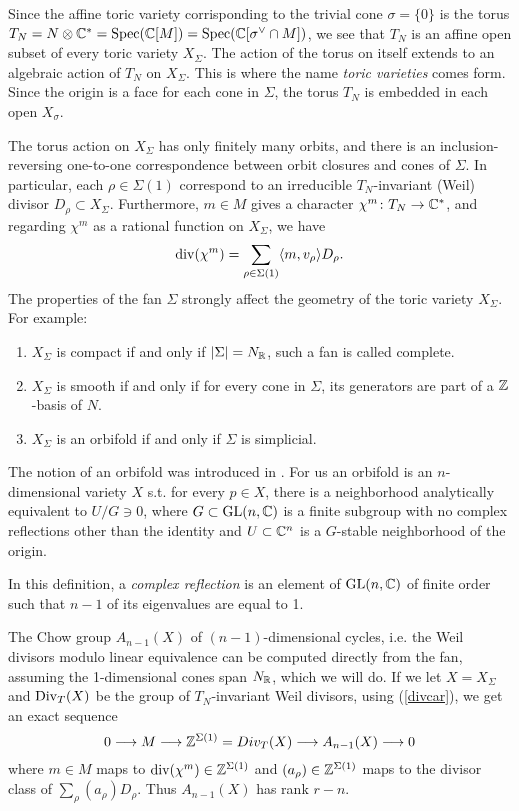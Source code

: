 \documentclass[../main.tex]{subfiles}
\begin{document}
%
%

Since the affine toric variety corrisponding to the trivial cone $\sigma=\{0\}$ is the torus $T_N = N \otimes \mathbb{C}^* = \operatorname{Spec}(\mathbb{C}[M]) = \operatorname{Spec}(\mathbb{C}[\sigma^\vee \cap M])$, we see that $T_N$ is an affine open subset of every toric variety $X_\Sigma$. The action of the torus on itself extends to an algebraic action of $T_N$ on $X_\Sigma$. This is where the name \emph{toric varieties} comes form.
Since the origin is a face for each cone in $\Sigma$, the torus $T_N$ is embedded in each open $X_\sigma$.

The torus action on $X_\Sigma$ has only finitely many orbits, and there is an inclusion-reversing one-to-one correspondence between orbit closures and cones of $\Sigma$. In particular, each $\rho \in \Sigma(1) $ correspond to an irreducible $T_N$-invariant (Weil) divisor $D_\rho \subset X_\Sigma$. Furthermore, $m \in M$ gives a character $\chi^m \colon T_N \to \mathbb{C}^*$, and regarding $\chi^m$ as a rational function on $X_\Sigma$, we have
\begin{equation}\label{divcar}
    \operatorname{div}(\chi^m)= \sum_{\rho \in \Sigma(1)} \langle m, v_\rho \rangle D_\rho.
\end{equation}
The properties of the fan  $\Sigma$ strongly affect the geometry of the toric variety $X_\Sigma$. For example:
\begin{enumerate}
    \item $X_\Sigma$ is compact if and only if $| \Sigma | = N_{\mathbb{R}}$, such a fan is called complete.
    \item $X_\Sigma$ is smooth if and only if for every cone in $\Sigma$, its generators are part of a $\mathbb{Z}$-basis of $N$.
    \item $X_\Sigma$ is an orbifold if and only if $\Sigma$ is simplicial.
    \end{enumerate}

    The notion of an orbifold was introduced in \cite{Thu97}. For us an orbifold is an $n$-dimensional variety $X$ s.t. for every $p \in X$, there is a neighborhood analytically equivalent to $U/G \ni 0$, where $G \subset \operatorname{GL} (n,\mathbb{C})$ is a finite subgroup with no complex reflections other than the identity and $U \subset \mathbb{C}^n$ is a $G$-stable neighborhood of the origin.

    In this definition, a \emph{complex reflection} is an element of $\operatorname{GL} (n,\mathbb{C})$ of finite order such that $n-1$ of its eigenvalues are equal to 1.
    
The Chow group $A_{n-1}(X)$ of $(n-1)$-dimensional cycles, i.e. the Weil divisors modulo linear equivalence can be computed directly from the fan, assuming the 1-dimensional cones span $N_{\mathbb{R}}$, which we will do. If we let $X=X_\Sigma$ and $\operatorname{Div}_T(X)$ be the group of $T_N$-invariant Weil divisors, using (\ref{divcar}), we get an exact sequence
\begin{equation}
    0 \longrightarrow M \longrightarrow \mathbb{Z}^{\Sigma(1)}=Div_T(X) \longrightarrow A_{n-1}(X) \longrightarrow 0
\end{equation}
where $m \in M$ maps to $\operatorname{div} (\chi^m) \in \mathbb{Z}^{\Sigma(1)}$ and $(a_\rho) \in \mathbb{Z}^{\Sigma(1)}$ maps to the divisor class of $\sum_\rho (a_\rho)D_\rho $. Thus $A_{n-1}(X)$ has rank $r-n$.
\end{document}
